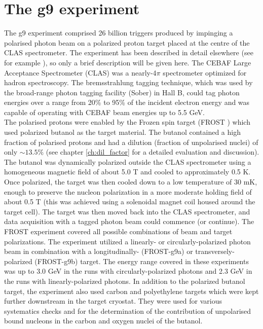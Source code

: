 \section{The g9 experiment}
The g9 experiment comprised 26 billion triggers produced by impinging  a  polarised photon beam on a polarized proton target placed at the centre of the CLAS spectrometer. The experiment has been described in detail elsewhere (see for example \cite{Strauch_2014}), so only a brief description will be given here. 
 The CEBAF Large Acceptance Spectrometer (CLAS)\cite{CLAS} was a nearly-4$\pi$ spectrometer optimized for hadron spectroscopy. The bremsstrahlung tagging technique, which was used by the broad-range photon tagging facility (Sober\cite{Sober_2000}) in Hall B, could tag photon energies over a range from 20\% to 95\% of the incident electron energy and was capable of operating with CEBAF beam energies up to 5.5 GeV. \\
The polarised protons were enabled by the Frozen spin target (FROST \cite{Keith_2012}) which used polarized butanol as the target material.
The butanol contained a high fraction of polarised protons and had a dilution (fraction of unpolarised nuclei) of only $\sim 13.5\%$ (see chapter \ref{ch:dil_factor} for a detailed evaluation and discussion).
 The butanol was dynamically polarized outside the CLAS spectrometer using a homogeneous magnetic field of about 5.0 T and cooled to approximately 0.5 K. Once polarized, the target was then cooled down to a low temperature of 30 mK, enough to preserve the nucleon polarization in a more moderate holding field of about 0.5 T (this was achieved using a solenoidal magnet coil housed around the target cell). The target was then moved back into the CLAS spectrometer, and data acquisition with a tagged photon beam could commence (or continue). The FROST experiment covered all possible combinations of beam and target polarizations. The experiment utilized a linearly- or circularly-polarized photon beam in combination with a longitudinally- (FROST-g9a) or transversely-polarized (FROST-g9b) target. The energy range covered in these experiments was up to 3.0 GeV in the runs with circularly-polarized photons and 2.3 GeV in the runs with linearly-polarized photons. In addition to the polarized butanol target, the experiment also used carbon and polyethylene targets which were kept further downstream in the target cryostat. They were used for various systematics checks and for the determination of the contribution of unpolarised bound nucleons in the carbon and oxygen nuclei of the butanol.
